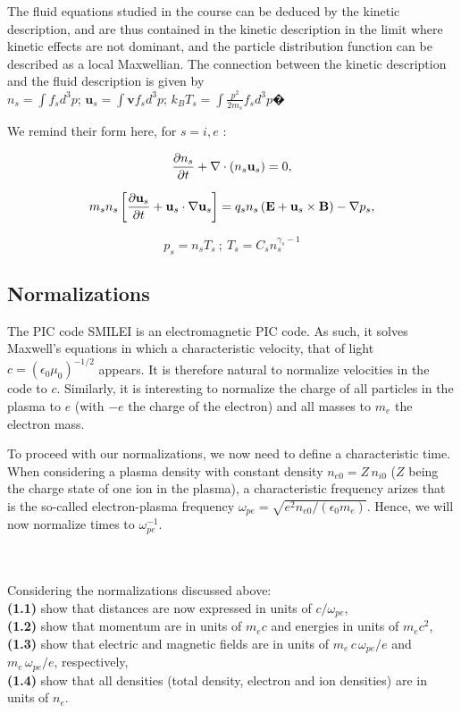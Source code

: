 \documentclass[11pt,a4paper]{article}
\newcommand{\vE}{\mathbf{E}}
\newcommand{\vB}{\mathbf{B}}
\newcommand{\vv}{\mathbf{v}}
\newcommand{\vu}{\mathbf{u}}
\begin{document}
The fluid equations studied in the course can be deduced by the kinetic description, and are thus contained in the kinetic description 
in the limit where kinetic effects are not dominant, and the particle distribution function can be described as a local Maxwellian. 
The connection between the kinetic description and the fluid description is given by \\$n_s= \int f_s d^3p$; $\vu_s =
\int \vv f_s d^3p$; $k_B T_s =\int \frac{p^2}{2m_s}  f_s d^3p$�

We remind their form here, for  $s=i,e$ :

\begin{equation}
\frac{\partial  n_s}{\partial t}+
 {\bf{\nabla}} \cdot (n_s \vu_s) =  0,
\end{equation}

\begin{equation}
m_s n_s \left[\frac{\partial \vu_s}{\partial t}+\vu_s \cdot {\bf{\nabla}} \vu_s
\right] = q_s n_s \left( \vE + \vu_s \times \vB \right) - {\bf{\nabla}} p_s ,  
\end{equation}


\begin{equation}
p_s = n_s T_s ~;~  
T_s = C_s n_s^{\gamma_s-1}
\end{equation}

\subsection*{Normalizations}

The PIC code SMILEI is an electromagnetic PIC code. As such, it solves Maxwell's equations in which a characteristic velocity, that of light $c = (\epsilon_0 \mu_0)^{-1/2}$ appears. It is therefore natural to normalize velocities in the code to $c$. Similarly, it is interesting to normalize the charge of all particles in the plasma to $e$ (with $-e$ the charge of the electron) and all masses to $m_e$ the electron mass.

To proceed with our normalizations, we now need to define a characteristic time. When considering a plasma density with constant density $n_{e0} = Z\,n_{i0}$ ($Z$ being the charge state of one ion in the plasma), a characteristic frequency arizes that is the so-called electron-plasma frequency $\omega_{pe} = \sqrt{e^2 n_{e0}/(\epsilon_0 m_e)}$. Hence, we will now normalize times to $\omega_{pe}^{-1}$.

$ $\\
\\
Considering the normalizations discussed above: \\
{\bf (1.1)} show that distances are now expressed in units of $c/\omega_{pe}$,\\
{\bf (1.2)} show that momentum are in units of $m_e c$ and energies in units of $m_e c^2$,\\
{\bf (1.3)} show that electric and magnetic fields are in units of $m_e\,c\,\omega_{pe}/e$ and $m_e\,\omega_{pe}/e$, respectively,\\
{\bf (1.4)} show that all densities (total density, electron and ion densities) are in units of $n_e$.
\end{document}
